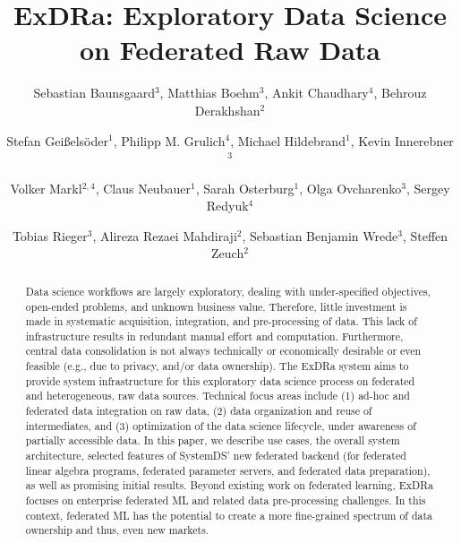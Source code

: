 \documentclass[sigconf,screen]{acmart}
\begin{document}
\fancyhead{}

\title{ExDRa: Exploratory Data Science on Federated Raw Data}

\author{Sebastian Baunsgaard$^3$,
Matthias Boehm$^3$,
Ankit Chaudhary$^4$,
Behrouz Derakhshan$^2$}
\author{Stefan Gei{\ss}els{\"o}der$^1$,
Philipp M. Grulich$^4$,
Michael Hildebrand$^1$,
Kevin Innerebner$^3$}
\author{Volker Markl$^{2,4}$,
Claus Neubauer$^1$,
Sarah Osterburg$^1$,
Olga Ovcharenko$^3$,
Sergey Redyuk$^4$}
\author{Tobias Rieger$^3$,
Alireza Rezaei Mahdiraji$^2$,
Sebastian Benjamin Wrede$^3$,
Steffen Zeuch$^2$}

\renewcommand{\shortauthors}{Baunsgaard et al.}

\begin{abstract}
Data science workflows are largely exploratory, dealing with under-specified objectives, open-ended problems, and unknown business value. Therefore, little investment is made in systematic acquisition, integration, and pre-processing of data.
This lack of infrastructure results in redundant manual effort and computation. Furthermore, central data consolidation is not always technically or economically desirable or even feasible (e.g., due to privacy, and/or data ownership).
The ExDRa system aims to provide system infrastructure for this exploratory data science process on federated and heterogeneous, raw data sources. Technical focus areas include (1) ad-hoc and federated data integration on raw data, (2) data organization and reuse of intermediates, and (3) optimization of the data science lifecycle, under awareness of partially accessible data. In this paper, we describe use cases, the overall system architecture, selected features of SystemDS' new federated backend (for federated linear algebra programs, federated parameter servers, and federated data preparation), as well as promising initial results.
Beyond existing work on federated learning, ExDRa focuses on enterprise federated ML and related data pre-processing challenges. In this context, federated ML has the potential to create a more fine-grained spectrum of data ownership and thus, even new markets.
\end{abstract}
\end{document}
